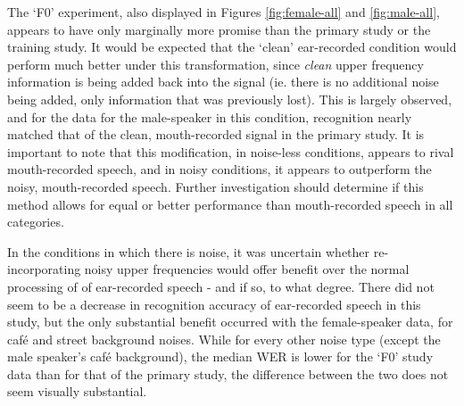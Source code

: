 % 


The `F0' experiment, also displayed in Figures \ref{fig:female-all} and \ref{fig:male-all}, appears to have only marginally more promise than the primary study or the training study.  It would be expected that the `clean' ear-recorded condition would perform much better under this transformation, since \textit{clean} upper frequency information is being added back into the signal (ie. there is no additional noise being added, only information that was previously lost).  This is largely observed, and for the data for the male-speaker in this condition, recognition nearly matched that of the clean, mouth-recorded signal in the primary study.  It is important to note that this modification, in noise-less conditions, appears to rival mouth-recorded speech, and in noisy conditions, it appears to outperform the noisy, mouth-recorded speech.  Further investigation should determine if this method allows for equal or better performance than mouth-recorded speech in all categories.

In the conditions in which there is noise, it was uncertain whether re-incorporating noisy upper frequencies would offer benefit over the normal processing of of ear-recorded speech - and if so, to what degree.  There did not seem to be a decrease in recognition accuracy of ear-recorded speech in this study, but the only substantial benefit occurred with the female-speaker data, for caf\'{e} and street background noises.  While for every other noise type (except the male speaker's caf\'{e} background), the median WER is lower for the `F0' study data than for that of the primary study, the difference between the two does not seem visually substantial.

